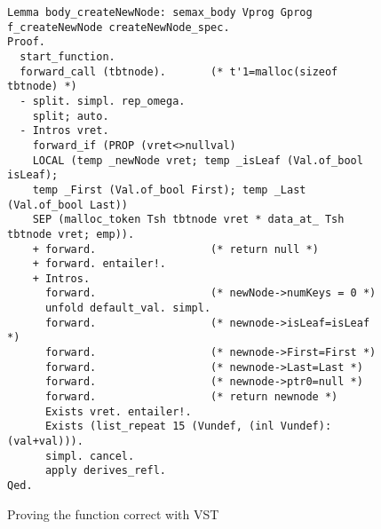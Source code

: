 \begin{figure}
  \begin{lstlisting}[language=Coq]
Lemma body_createNewNode: semax_body Vprog Gprog f_createNewNode createNewNode_spec.
Proof.
  start_function.
  forward_call (tbtnode).       (* t'1=malloc(sizeof tbtnode) *)
  - split. simpl. rep_omega.
    split; auto.
  - Intros vret.
    forward_if (PROP (vret<>nullval)
    LOCAL (temp _newNode vret; temp _isLeaf (Val.of_bool isLeaf);
    temp _First (Val.of_bool First); temp _Last (Val.of_bool Last))
    SEP (malloc_token Tsh tbtnode vret * data_at_ Tsh tbtnode vret; emp)).
    + forward.                  (* return null *)
    + forward. entailer!.
    + Intros. 
      forward.                  (* newNode->numKeys = 0 *)
      unfold default_val. simpl.
      forward.                  (* newnode->isLeaf=isLeaf *)
      forward.                  (* newnode->First=First *)
      forward.                  (* newnode->Last=Last *)
      forward.                  (* newnode->ptr0=null *)
      forward.                  (* return newnode *)
      Exists vret. entailer!.
      Exists (list_repeat 15 (Vundef, (inl Vundef):(val+val))).
      simpl. cancel.
      apply derives_refl.
Qed.
  \end{lstlisting}
  \caption{Proving the function correct with VST}
\end{figure}

    

    
    
